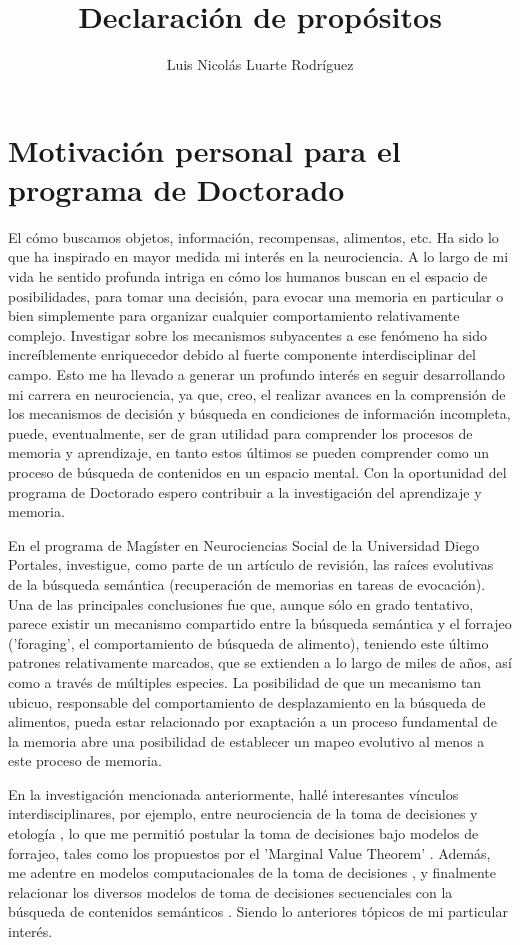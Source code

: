 \documentclass[11pt]{article}
\author{Luis Nicolás Luarte Rodríguez}
\date{}
\title{Declaración de propósitos}
\begin{document}
\maketitle
\section*{Motivación personal para el programa de Doctorado}
\label{sec:orgaaae1e8}
El cómo buscamos objetos, información, recompensas, alimentos, etc. Ha sido lo
que ha inspirado en mayor medida mi interés en la neurociencia. A lo largo de mi
vida he sentido profunda intriga en cómo los humanos buscan en el espacio de
posibilidades, para tomar una decisión, para evocar una memoria en particular o
bien simplemente para organizar cualquier comportamiento relativamente complejo.
Investigar sobre los mecanismos subyacentes a ese fenómeno ha sido
increíblemente enriquecedor debido al fuerte componente interdisciplinar del
campo. Esto me ha llevado a generar un profundo interés en seguir desarrollando
mi carrera en neurociencia, ya que, creo, el realizar avances en la comprensión
de los mecanismos de decisión y búsqueda en condiciones de información
incompleta, puede, eventualmente, ser de gran utilidad para comprender los
procesos de memoria y aprendizaje, en tanto estos últimos se pueden comprender
como un proceso de búsqueda de contenidos en un espacio mental. Con la
oportunidad del programa de Doctorado espero contribuir a la investigación del
aprendizaje y memoria.

En el programa de Magíster en Neurociencias Social de la Universidad Diego
Portales, investigue, como parte de un artículo de revisión, las raíces
evolutivas de la búsqueda semántica (recuperación de memorias en tareas de
evocación). Una de las principales conclusiones fue que, aunque sólo en grado
tentativo, parece existir un mecanismo compartido entre la búsqueda semántica y
el forrajeo ('foraging', el comportamiento de búsqueda de alimento), teniendo
este último patrones relativamente marcados, que se extienden a lo largo de
miles de años, así como a través de múltiples especies. La posibilidad de que un
mecanismo tan ubicuo, responsable del comportamiento de desplazamiento en la
búsqueda de alimentos, pueda estar relacionado por exaptación a un proceso
fundamental de la memoria abre una posibilidad de establecer un mapeo evolutivo
al menos a este proceso de memoria.

En la investigación mencionada anteriormente, hallé interesantes vínculos
interdisciplinares, por ejemplo, entre neurociencia de la toma de decisiones y
etología \citep{mobbsForagingFoundationsDecision2018a}, lo que me permitió
postular la toma de decisiones bajo modelos de forrajeo, tales como los
propuestos por el 'Marginal Value Theorem'
\citep{charnovOptimalForagingMarginal1976}. Además, me adentre en modelos
computacionales de la toma de decisiones
\citep{aston-jonesINTEGRATIVETHEORYLOCUS2005a}, y finalmente relacionar los
diversos modelos de toma de decisiones secuenciales con la búsqueda de
contenidos semánticos \citep{hillsForagingSemanticFields2015}. Siendo lo
anteriores tópicos de mi particular interés.
\end{document}
